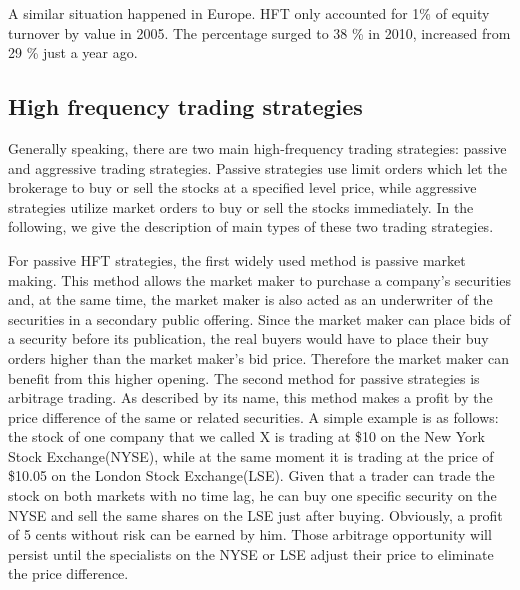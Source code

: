 A similar situation happened in Europe. HFT only accounted for 1\% of equity turnover by value in 2005. The percentage surged to 38 \% in 2010, increased from 29 \% just a year ago.
\subsection{High frequency trading strategies}
Generally speaking, there are two main high-frequency trading strategies: passive and aggressive trading strategies. Passive strategies use limit orders which let the brokerage to buy or sell the stocks at a specified level price, while aggressive strategies utilize market orders to buy or sell the stocks immediately. In the following, we give the description of main types of these two trading strategies. 

For passive HFT strategies, the first widely used method is passive market making. This method allows the market maker to purchase a company's securities and, at the same time, the market maker is also acted as an underwriter of the 
securities in a secondary public offering. Since the market maker can place bids of a security before its publication, the real buyers would have to place their buy orders higher than the market maker's bid price. Therefore the market maker can  benefit from this higher opening. The second method for passive strategies is arbitrage trading. As described by its name, this method makes a profit by the price difference of the same or related securities. A simple example is as follows: the stock of one company that we called X is trading at \$10 on the New York Stock Exchange(NYSE), while at the same moment it is trading at the price of \$10.05 on the London Stock Exchange(LSE).  Given that a trader can trade the stock on both markets with no time lag, he can buy one specific security on the NYSE and sell the same shares on the LSE just after buying. Obviously, a profit of 5 cents without risk can be earned by him. Those arbitrage opportunity will persist until the specialists on the NYSE or LSE adjust their price to eliminate the price difference.

